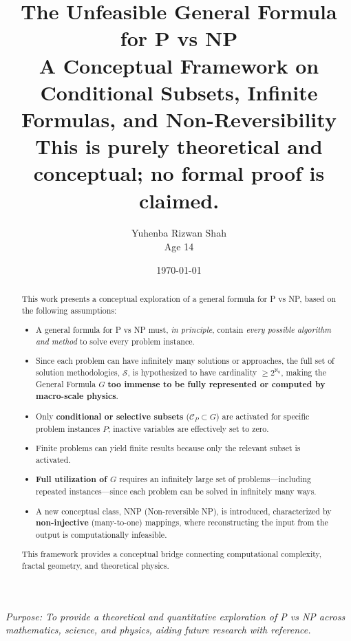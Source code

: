 \documentclass[12pt]{article}
\title{\textbf{The Unfeasible General Formula for P vs NP}\\
\large A Conceptual Framework on Conditional Subsets, Infinite Formulas, and Non-Reversibility \\
\textbf{This is purely theoretical and conceptual; no formal proof is claimed.}}
\author{Yuhenba Rizwan Shah \\ Age 14}
\date{\today}
\begin{document}
\maketitle
\thispagestyle{empty}

\vspace{2cm}

\begin{abstract}
This work presents a conceptual exploration of a general formula for P vs NP, based on the following assumptions:

\begin{itemize}
    \item A general formula for P vs NP must, \textit{in principle}, contain \textit{every possible algorithm and method} to solve every problem instance.
    \item Since each problem can have infinitely many solutions or approaches, the full set of solution methodologies, $\mathcal{S}$, is hypothesized to have cardinality $\ge 2^{\aleph_0}$, making the General Formula $G$ \textbf{too immense to be fully represented or computed by macro-scale physics}.
    \item Only \textbf{conditional or selective subsets} ($\mathcal{C}_P \subset G$) are activated for specific problem instances $P$; inactive variables are effectively set to zero.
    \item Finite problems can yield finite results because only the relevant subset is activated.
    \item \textbf{Full utilization of $G$} requires an infinitely large set of problems—including repeated instances—since each problem can be solved in infinitely many ways.
    \item A new conceptual class, NNP (Non-reversible NP), is introduced, characterized by \textbf{non-injective} (many-to-one) mappings, where reconstructing the input from the output is computationally infeasible.
\end{itemize}

This framework provides a conceptual bridge connecting computational complexity, fractal geometry, and theoretical physics.
\end{abstract}

\vfill

\begin{center}
\textit{Purpose: To provide a theoretical and quantitative exploration of P vs NP across mathematics, science, and physics, aiding future research with reference.}
\end{center}
\end{document}

